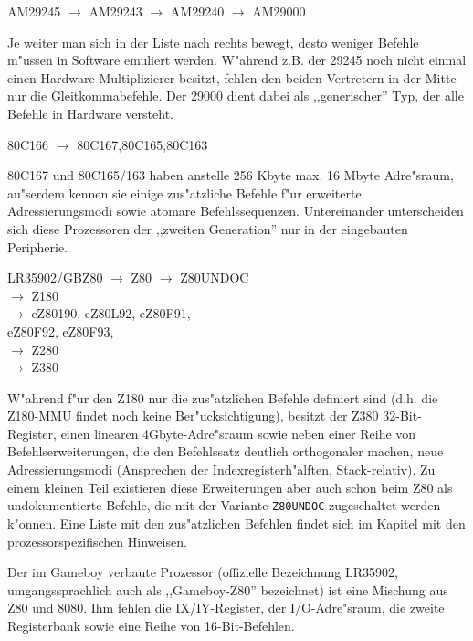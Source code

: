 \documentclass[12pt,a4paper,twoside]{report}
\newcommand{\tty}[1]{{\tt #1}}
\begin{document}
\begin{cpulist}
   AM29245 $\rightarrow$ AM29243 $\rightarrow$ AM29240 $\rightarrow$ AM29000
\end{cpulist}
Je weiter man sich in der Liste nach rechts bewegt, desto weniger
Befehle m"ussen in Software emuliert werden.  W"ahrend z.B. der 29245
noch nicht einmal einen Hardware-Multiplizierer besitzt, fehlen den
beiden Vertretern in der Mitte nur die Gleitkommabefehle.  Der 29000
dient dabei als ,,generischer'' Typ, der alle Befehle in Hardware versteht.
\begin{cpulist}
   80C166 $\longrightarrow$ 80C167,80C165,80C163
\end{cpulist}
80C167 und 80C165/163 haben anstelle 256 Kbyte max. 16 Mbyte Adre"sraum,
au"serdem kennen sie einige zus"atzliche Befehle f"ur erweiterte
Adressierungsmodi sowie atomare Befehlssequenzen.  Untereinander
unterscheiden sich diese Prozessoren der ,,zweiten Generation'' nur in der
eingebauten Peripherie.
\begin{cpulist}
   LR35902/GBZ80 $\rightarrow$ Z80 $\rightarrow$ Z80UNDOC \\
\> $\rightarrow$ Z180 \\
\> $\rightarrow$ eZ80190, eZ80L92, eZ80F91, \\
\> eZ80F92, eZ80F93, \\
\> $\rightarrow$ Z280 \\
\> $\rightarrow$ Z380
\end{cpulist}
W"ahrend f"ur den Z180 nur die zus"atzlichen Befehle definiert sind
(d.h. die Z180-MMU findet noch keine Ber"ucksichtigung), besitzt der
Z380 32-Bit-Register, einen linearen 4Gbyte-Adre"sraum sowie neben
einer Reihe von Befehlserweiterungen, die den Befehlssatz deutlich
orthogonaler machen, neue Adressierungsmodi (Ansprechen der
Indexregisterh"alften, Stack-relativ).  Zu einem kleinen Teil existieren
diese Erweiterungen aber auch schon beim Z80 als undokumentierte
Befehle, die mit der Variante \tty{Z80UNDOC} zugeschaltet werden
k"onnen.  Eine Liste mit den zus"atzlichen Befehlen findet sich im
Kapitel mit den prozessorspezifischen Hinweisen.

Der im Gameboy verbaute Prozessor (offizielle Bezeichnung LR35902,
umgangssprachlich auch als ,,Gameboy-Z80'' bezeichnet) ist eine
Mischung aus Z80 und 8080.  Ihm fehlen die IX/IY-Register, der
I/O-Adre"sraum, die zweite Registerbank sowie eine Reihe von
16-Bit-Befehlen.
\end{document}
